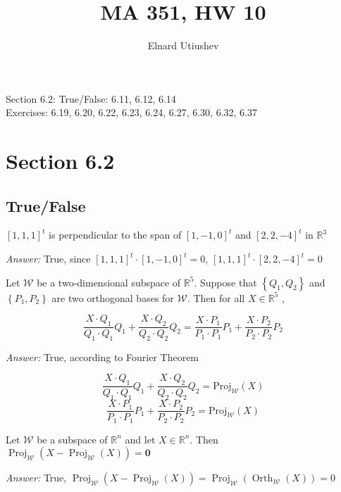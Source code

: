 \documentclass[letterpaper]{article}
\title{MA 351, HW 10}
\author{Elnard Utiushev}
\newcommand{\ans}{\textit{Answer: }}
\newenvironment{question}[2][Question]{\begin{trivlist}
\item[\hskip \labelsep {\bfseries #1}\hskip \labelsep {\bfseries #2.}]}{\end{trivlist}}
\begin{document}
\maketitle

Section 6.2: True/False: 6.11, 6.12, 6.14\\
Exercises: 6.19, 6.20, 6.22, 6.23, 6.24, 6.27, 6.30, 6.32, 6.37

\section{Section 6.2}
\subsection{True/False}

\begin{question}{6.11}
  $[1,1,1]^{t}$ is perpendicular to the span of $[1,-1,0]^{t}$ and 
  $[2,2,-4]^{t}$ in $\mathbb{R}^{3}$

  \ans True, since 
  $[1,1,1]^{t} \cdot [1,-1,0]^{t} = 0$, 
  $[1,1,1]^{t} \cdot [2,2,-4]^{t} = 0$
\end{question}

\begin{question}{6.12}
  Let $\mathcal{W}$ be a two-dimensional subspace of $\mathbb{R}^{5} .$ 
  Suppose that $\left\{Q_{1}, Q_{2}\right\}$ and
  $\left\{P_{1}, P_{2}\right\}$ are two orthogonal bases for $\mathcal{W} .$ 
  Then for all $X \in \mathbb{R}^{5}$ ,

  $$
  \frac{X \cdot Q_{1}}{Q_{1} \cdot Q_{1}} Q_{1}+\frac{X \cdot Q_{2}}{Q_{2} \cdot Q_{2}} Q_{2}=\frac{X \cdot P_{1}}{P_{1} \cdot P_{1}} P_{1}+\frac{X \cdot P_{2}}{P_{2} \cdot P_{2}} P_{2}
  $$

  \ans True, according to Fourier Theorem

  $$
  \frac{X \cdot Q_{1}}{Q_{1} \cdot Q_{1}} Q_{1}+\frac{X \cdot Q_{2}}{Q_{2} \cdot Q_{2}} Q_{2}
  = \text{Proj}_\mathcal{W} (X)
  $$
  $$
  \frac{X \cdot P_{1}}{P_{1} \cdot P_{1}} P_{1}+\frac{X \cdot P_{2}}{P_{2} \cdot P_{2}} P_{2}
  = \text{Proj}_\mathcal{W} (X)
  $$
\end{question}

\begin{question}{6.14}
  Let $\mathcal{W}$ be a subspace of $\mathbb{R}^{n}$ and let 
  $X \in \mathbb{R}^{n} .$ Then $\operatorname{Proj}_{\mathcal{W}}\left(X-\operatorname{Proj}_{\mathcal{W}}(X)\right)=\mathbf{0}$
  
  \ans True, 
  $\operatorname{Proj}_{\mathcal{W}}\left(X-\operatorname{Proj}_{\mathcal{W}}(X)\right)
  =\operatorname{Proj}_{\mathcal{W}}\left(\operatorname{Orth}_{\mathcal{W}}(X)\right)
  =0
  $
\end{question}
\end{document}
